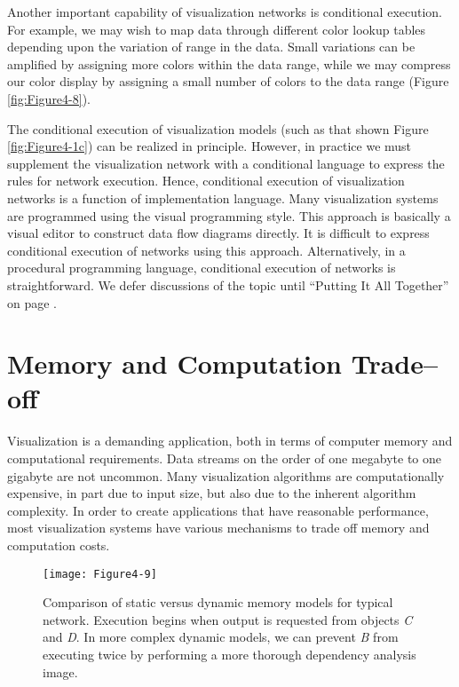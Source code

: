 Another important capability of visualization networks is conditional execution. For example, we may wish to map data through different color lookup tables depending upon the variation of range in the data. Small variations can be amplified by assigning more colors within the data range, while we may compress our color display by assigning a small number of colors to the data range (Figure \ref{fig:Figure4-8}). 

The conditional execution of visualization models (such as that shown Figure \ref{fig:Figure4-1c}) can be realized in principle. However, in practice we must supplement the visualization network with a conditional language to express the rules for network execution. Hence, conditional execution of visualization networks is a function of implementation language. Many visualization systems are programmed using the visual programming style. This approach is basically a visual editor to construct data flow diagrams directly. It is difficult to express conditional execution of networks using this approach. Alternatively, in a procedural programming language, conditional execution of networks is straightforward. We defer discussions of the topic until ``Putting It All Together'' on page \pageref{sec:chap04.putting_it_all_together}.

\section{Memory and Computation Trade--off}
\label{sec:memory_computation_trade--off}

Visualization is a demanding application, both in terms of computer memory and computational requirements. Data streams on the order of one megabyte to one gigabyte are not uncommon. Many visualization algorithms are computationally expensive, in part due to input size, but also due to the inherent algorithm complexity. In order to create applications that have reasonable performance, most visualization systems have various mechanisms to trade off memory and computation costs.

\begin{figure}[!htb]
  \centering
  \texttt{[image: Figure4-9]}\\
  \caption{Comparison of static versus dynamic memory models for typical network. Execution begins when output is requested from objects \emph{C} and \emph{D}. In more complex dynamic models, we can prevent \emph{B} from executing twice by performing a more thorough dependency analysis image.}\label{fig:Figure4-9}
\end{figure}

